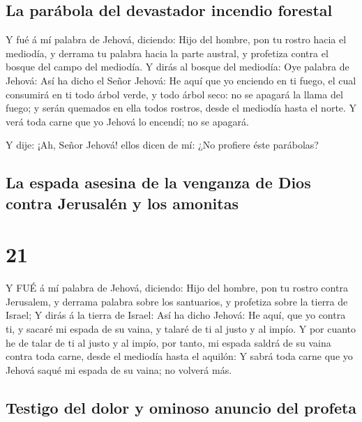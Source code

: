 \hypertarget{la-paruxe1bola-del-devastador-incendio-forestal}{%
\subsection{La parábola del devastador incendio
forestal}\label{la-paruxe1bola-del-devastador-incendio-forestal}}

 Y fué á mí palabra de Jehová, diciendo:  Hijo
del hombre, pon tu rostro hacia el mediodía, y derrama tu palabra hacia
la parte austral, y profetiza contra el bosque del campo del mediodía.
 Y dirás al bosque del mediodía: Oye palabra de Jehová: Así
ha dicho el Señor Jehová: He aquí que yo enciendo en ti fuego, el cual
consumirá en ti todo árbol verde, y todo árbol seco: no se apagará la
llama del fuego; y serán quemados en ella todos rostros, desde el
mediodía hasta el norte.  Y verá toda carne que yo Jehová
lo encendí; no se apagará.

 Y dije: ¡Ah, Señor Jehová! ellos dicen de mí: ¿No profiere
éste parábolas?

\hypertarget{la-espada-asesina-de-la-venganza-de-dios-contra-jerusaluxe9n-y-los-amonitas}{%
\subsection{La espada asesina de la venganza de Dios contra Jerusalén y
los
amonitas}\label{la-espada-asesina-de-la-venganza-de-dios-contra-jerusaluxe9n-y-los-amonitas}}

\hypertarget{section-20}{%
\section{21}\label{section-20}}

 Y FUÉ á mí palabra de Jehová, diciendo:  Hijo
del hombre, pon tu rostro contra Jerusalem, y derrama palabra sobre los
santuarios, y profetiza sobre la tierra de Israel;  Y dirás
á la tierra de Israel: Así ha dicho Jehová: He aquí, que yo contra ti, y
sacaré mi espada de su vaina, y talaré de ti al justo y al impío.
 Y por cuanto he de talar de ti al justo y al impío, por
tanto, mi espada saldrá de su vaina contra toda carne, desde el mediodía
hasta el aquilón:  Y sabrá toda carne que yo Jehová saqué mi
espada de su vaina; no volverá más.

\hypertarget{testigo-del-dolor-y-ominoso-anuncio-del-profeta}{%
\subsection{Testigo del dolor y ominoso anuncio del
profeta}\label{testigo-del-dolor-y-ominoso-anuncio-del-profeta}}

